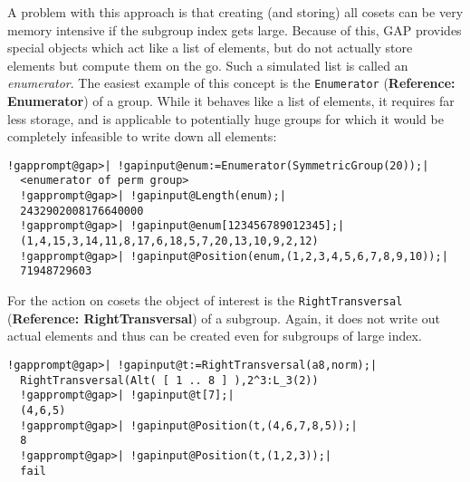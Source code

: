 \documentclass[a4paper,11pt]{report}
\begin{document}
{{ A problem with this approach is that creating (and storing) all cosets can be
very memory intensive if the subgroup index gets large. Because of this, \textsf{GAP} provides special objects which act like a list of elements, but do not
actually store elements but compute them on the go. Such a simulated list is
called an \emph{enumerator}. The easiest example of this concept is the \texttt{Enumerator} (\textbf{Reference: Enumerator}) of a group. While it behaves like a list of elements, it requires far less
storage, and is applicable to potentially huge groups for which it would be
completely infeasible to write down all elements: 
\begin{Verbatim}[commandchars=!@|,fontsize=\small,frame=single,label=Example]
  !gapprompt@gap>| !gapinput@enum:=Enumerator(SymmetricGroup(20));|
  <enumerator of perm group>
  !gapprompt@gap>| !gapinput@Length(enum);|
  2432902008176640000
  !gapprompt@gap>| !gapinput@enum[123456789012345];|
  (1,4,15,3,14,11,8,17,6,18,5,7,20,13,10,9,2,12)
  !gapprompt@gap>| !gapinput@Position(enum,(1,2,3,4,5,6,7,8,9,10));|
  71948729603
\end{Verbatim}
 

 For the action on cosets the object of interest is the \texttt{RightTransversal} (\textbf{Reference: RightTransversal}) of a subgroup. Again, it does not write out actual elements and thus can be
created even for subgroups of large index. 
\begin{Verbatim}[commandchars=!@|,fontsize=\small,frame=single,label=Example]
  !gapprompt@gap>| !gapinput@t:=RightTransversal(a8,norm);|
  RightTransversal(Alt( [ 1 .. 8 ] ),2^3:L_3(2))
  !gapprompt@gap>| !gapinput@t[7];|
  (4,6,5)
  !gapprompt@gap>| !gapinput@Position(t,(4,6,7,8,5));|
  8
  !gapprompt@gap>| !gapinput@Position(t,(1,2,3));|
  fail
\end{Verbatim}
 

}}
\end{document}
